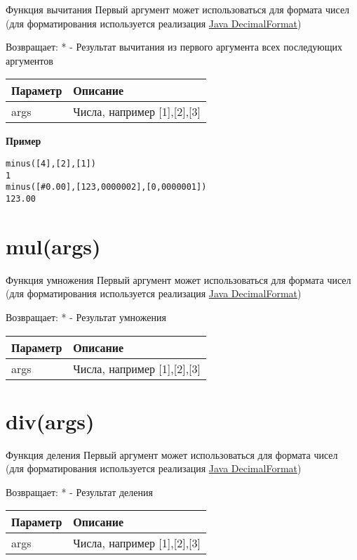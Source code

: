 Функция вычитания Первый аргумент может использоваться для формата чисел
(для форматирования используется реализация
\href{https://docs.oracle.com/javase/7/docs/api/java/text/DecimalFormat.html}{Java
DecimalFormat})

Возвращает: * - Результат вычитания из первого аргумента всех
последующих аргументов

\begin{longtable}[]{@{}ll@{}}
\toprule
Параметр & Описание\tabularnewline
\midrule
\endhead
args & Числа, например {[}1{]},{[}2{]},{[}3{]}\tabularnewline
\bottomrule
\end{longtable}

\textbf{Пример}

\begin{verbatim}
minus([4],[2],[1])
1
minus([#0.00],[123,0000002],[0,0000001])
123.00
\end{verbatim}

\hypertarget{mulargs}{%
\section{mul(args)}\label{mulargs}}

Функция умножения Первый аргумент может использоваться для формата чисел
(для форматирования используется реализация
\href{https://docs.oracle.com/javase/7/docs/api/java/text/DecimalFormat.html}{Java
DecimalFormat})

Возвращает: * - Результат умножения

\begin{longtable}[]{@{}ll@{}}
\toprule
Параметр & Описание\tabularnewline
\midrule
\endhead
args & Числа, например {[}1{]},{[}2{]},{[}3{]}\tabularnewline
\bottomrule
\end{longtable}

\hypertarget{divargs}{%
\section{div(args)}\label{divargs}}

Функция деления Первый аргумент может использоваться для формата чисел
(для форматирования используется реализация
\href{https://docs.oracle.com/javase/7/docs/api/java/text/DecimalFormat.html}{Java
DecimalFormat})

Возвращает: * - Результат деления

\begin{longtable}[]{@{}ll@{}}
\toprule
Параметр & Описание\tabularnewline
\midrule
\endhead
args & Числа, например {[}1{]},{[}2{]},{[}3{]}\tabularnewline
\bottomrule
\end{longtable}

